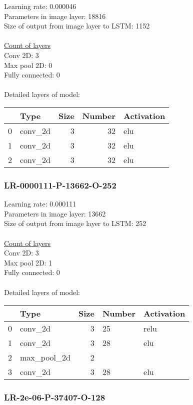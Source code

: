 Learning rate: 0.000046
\\Parameters in image layer: 18816
\\Size of output from image layer to LSTM: 1152
\\\\\underline{Count of layers} 
\\Conv 2D:           3\\Max pool 2D:      0\\Fully connected:  0
\\\\Detailed layers of model: \\\begin{tabular}{rlrrl}
\hline
    & Type    &   Size &   Number & Activation   \\
\hline
  0 & conv\_2d &      3 &       32 & elu          \\
  1 & conv\_2d &      3 &       32 & elu          \\
  2 & conv\_2d &      3 &       32 & elu          \\
\hline
\end{tabular}\subsubsection*{LR-0000111-P-13662-O-252}
Learning rate: 0.000111
\\Parameters in image layer: 13662
\\Size of output from image layer to LSTM: 252
\\\\\underline{Count of layers} 
\\Conv 2D:           3\\Max pool 2D:      1\\Fully connected:  0
\\\\Detailed layers of model: \\\begin{tabular}{rlrll}
\hline
    & Type        &   Size & Number   & Activation   \\
\hline
  0 & conv\_2d     &      3 & 25       & relu         \\
  1 & conv\_2d     &      3 & 28       & elu          \\
  2 & max\_pool\_2d &      2 &          &              \\
  3 & conv\_2d     &      3 & 28       & elu          \\
\hline
\end{tabular}\subsubsection*{LR-2e-06-P-37407-O-128}
